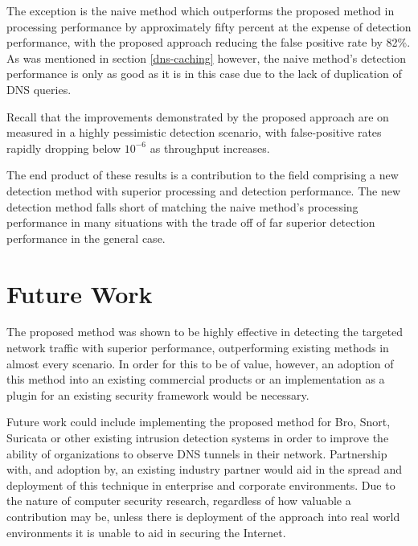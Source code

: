 \documentclass[12pt]{report}
\theoremstyle{remark}
\theoremstyle{definition}
\theoremstyle{definition}
\theoremstyle{definition}
\begin{document}
The exception is the naive method which outperforms the proposed method in
processing performance by approximately fifty percent at the expense of
detection performance, with the proposed approach reducing the false positive
rate by 82\%. As was mentioned in section \ref{dns-caching} however,
the naive method's detection performance is only as good as it is in this case
due to the lack of duplication of DNS queries.

Recall that the improvements demonstrated by the proposed approach are on
measured in a highly pessimistic detection scenario, with false-positive rates
rapidly dropping below $10^{-6}$ as throughput increases.

The end product of these results is a contribution to the field comprising a new
detection method with superior processing and detection performance. The new
detection method falls short of matching the naive method's processing
performance in many situations with the trade off of far superior detection
performance in the general case.

\section{Future Work}

The proposed method was shown to be highly effective in detecting the targeted
network traffic with superior performance, outperforming existing methods in almost
every scenario. In order for this to be of value, however, an adoption of this
method into an existing commercial products or an implementation as a plugin for
an existing security framework would be necessary.

Future work could include implementing the proposed method for Bro, Snort,
Suricata or other existing intrusion detection systems in order to improve
the ability of organizations to observe DNS tunnels in their network. Partnership with, and
adoption by, an existing industry partner would aid in the spread and deployment of
this technique in enterprise and corporate environments. Due to the nature of
computer security research, regardless of how valuable a contribution may be, unless
there is deployment of the approach into real world environments it is unable
to aid in securing the Internet.
\end{document}
